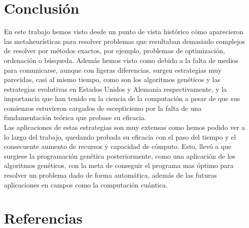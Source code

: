 \documentclass[12pt]{article} \usepackage[utf8]{inputenc}
\begin{document}
\section{Conclusión}

En este trabajo hemos visto desde un punto de vista histórico cómo aparecieron las
metaheurísticas para resolver problemas que resultaban demasiado complejos de resolver
por métodos exactos, por ejemplo, problemas de optimización, ordenación o búsqueda.
Además hemos visto como debido a la falta de medios para comunicarse, aunque con ligeras
diferencias, surgen estrategias muy parecidas, casi al mismo tiempo, como son los algoritmos
genéticos y las estrategias evolutivas en Estados Unidos y Alemania respectivamente, y la importancia
que han tenido en la ciencia de la computación a pesar de que sus comienzos estuvieron
cargados de escepticismo por la falta de una fundamentación teórica que probase su eficacia. \\

Las aplicaciones de estas estrategias son muy extensas como hemos podido ver a lo largo
del trabajo, quedando probada su eficacia con el paso del tiempo y el consecuente aumento
de recursos y capacidad de cómputo. Esto, llevó a que surgiese la programación genética
posteriormente, como una aplicación de los algoritmos genéticos, con la meta de conseguir el
programa mas óptimo para resolver un problema dado de forma automática, además de las futuras
aplicaciones en campos como la computación cuántica.

\newpage

\section{Referencias}
\begingroup
\renewcommand{\section}[2]{}
\nocite{*}
\printbibliography
\endgroup
\end{document}

